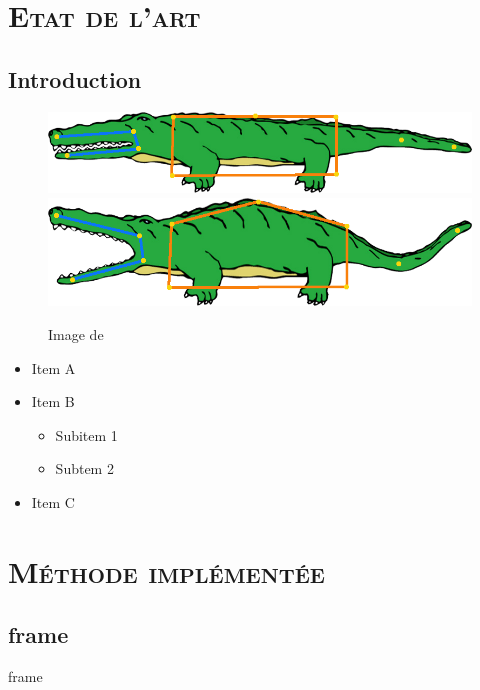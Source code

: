 \documentclass[xcolor=x11names,compress]{beamer}
\renewcommand{\(}{\begin{columns}} \renewcommand{\)}{\end{columns}}
\newcommand{\<}[1]{\begin{column}{#1}} \renewcommand{\>}{\end{column}}
\begin{document}
\section{\scshape Etat de l'art}
\subsection{Introduction}
\begin{frame}{}
  \begin{figure}[h]
    \begin{center}
      \includegraphics[scale=0.2]{alligator-avant.png}
      \includegraphics[scale=0.2]{alligator-apres.png}
    \end{center}
\caption{Image de \citet{JBPS11}}
  \end{figure}
  \begin{itemize}
  \item Item A
  \item Item B
    \begin{itemize}
    \item Subitem 1
    \item Subtem 2
    \end{itemize}
  \item Item C
  \end{itemize}
\end{frame}


\section{\scshape Méthode implémentée}
\subsection{frame}
\begin{frame}{frame}

\end{frame}
\end{document}
